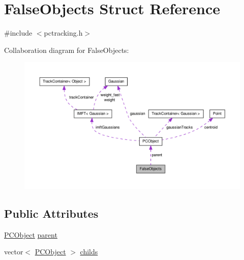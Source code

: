 \hypertarget{struct_false_objects}{\section{\-False\-Objects \-Struct \-Reference}
\label{struct_false_objects}
}


{\ttfamily \#include $<$pctracking.\-h$>$}



\-Collaboration diagram for \-False\-Objects\-:
\nopagebreak
\begin{figure}[H]
\begin{center}
\leavevmode
\includegraphics[width=350pt]{struct_false_objects__coll__graph}
\end{center}
\end{figure}
\subsection*{\-Public \-Attributes}
\begin{DoxyCompactItemize}
\item 
\hyperlink{class_p_c_object}{\-P\-C\-Object} \hyperlink{struct_false_objects_a72516a38ec12f2afd7fa072705ba7fd7}{parent}
\item 
vector$<$ \hyperlink{class_p_c_object}{\-P\-C\-Object} $>$ \hyperlink{struct_false_objects_a92ed26914ae6e1b3b628418e13eca43d}{childs}
\end{DoxyCompactItemize}


